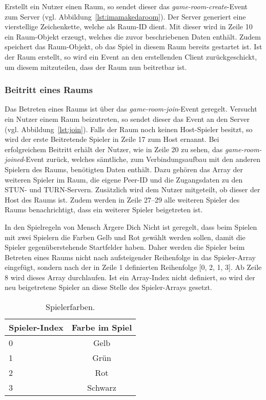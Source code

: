 Erstellt ein Nutzer einen Raum, so sendet dieser das \textit{game-room-create}-Event zum Server (vgl. Abbildung~\ref{lst:imamakedaroom}). Der Server generiert eine vierstellige Zeichenkette, welche als Raum-ID dient. Mit dieser wird in Zeile 10 ein Raum-Objekt erzeugt, welches die zuvor beschriebenen Daten enthält. Zudem speichert das Raum-Objekt, ob das Spiel in diesem Raum bereits gestartet ist. Ist der Raum erstellt, so wird ein Event an den erstellenden Client zurückgeschickt, um diesem mitzuteilen, dass der Raum nun beitretbar ist.\par

\subsubsection{Beitritt eines Raums}

Das Betreten eines Raums ist über das \textit{game-room-join}-Event geregelt. Versucht ein Nutzer einem Raum beizutreten, so sendet dieser das Event an den Server (vgl. Abbildung~\ref{lst:join}). Falls der Raum noch keinen Host-Spieler besitzt, so wird der erste Beitretende Spieler in Zeile 17 zum Host ernannt. Bei erfolgreichem Beitritt erhält der Nutzer, wie in Zeile 20 zu sehen, das \textit{game-room-joined}-Event zurück, welches sämtliche, zum Verbindungsaufbau mit den anderen Spielern des Raums, benötigten Daten enthält. Dazu gehören das Array der weiteren Spieler im Raum, die eigene Peer-ID und die Zugangsdaten zu den \acs{STUN}- und \acs{TURN}-Servern. Zusätzlich wird dem Nutzer mitgeteilt, ob dieser der Host des Raums ist. Zudem werden in Zeile 27--29 alle weiteren Spieler des Raums benachrichtigt, dass ein weiterer Spieler beigetreten ist.\par

In den Spielregeln von \glqq{}Mensch Ärgere Dich Nicht\grqq{} ist geregelt, dass beim Spielen mit zwei Spielern die Farben Gelb und Rot gewählt werden sollen, damit die Spieler gegenüberstehende Startfelder haben. Daher werden die Spieler beim Betreten eines Raums nicht nach aufsteigender Reihenfolge in das Spieler-Array eingefügt, sondern nach der in Zeile 1 definierten Reihenfolge [0, 2, 1, 3]. Ab Zeile 8 wird dieses Array durchlaufen. Ist ein Array-Index nicht definiert, so wird der neu beigetretene Spieler an diese Stelle des Spieler-Arrays gesetzt.\par

\begin{table}[ht]
\centering
\begin{tabular}[t]{lc}
\toprule
Spieler-Index&Farbe im Spiel\\
\midrule
0&Gelb\\
1&Grün\\
2&Rot\\
3&Schwarz\\
\bottomrule
\end{tabular}
\caption{Spielerfarben.}
\label{table:playercolors}
\end{table}

